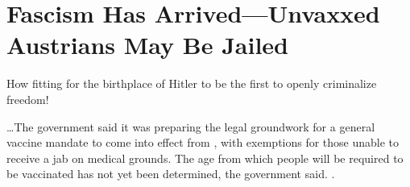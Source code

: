 \chapter{Fascism Has Arrived---Unvaxxed Austrians May Be Jailed}

\begin{refsection}

How fitting for the birthplace of Hitler to be the first to openly criminalize freedom!

\begin{tcolorbox}[quote]

\dots{}The government said it was preparing the legal groundwork for a general vaccine mandate to come into effect from , with exemptions for those unable to receive a jab on medical grounds. The age from which people will be required to be vaccinated has not yet been determined, the government said. .\textsuperscript{\cite{urlasd90u2m}}

\end{tcolorbox}

\printbibliography[heading=subbibliography]

\end{refsection}